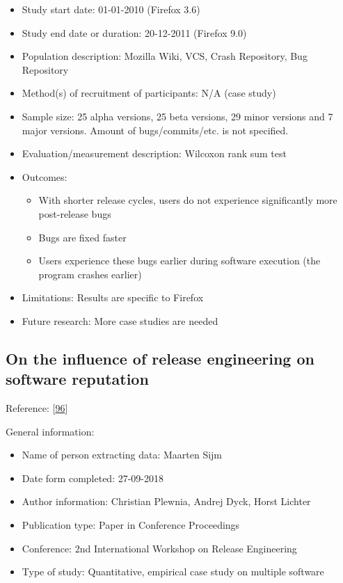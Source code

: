 \documentclass[]{book}
\providecommand{\tightlist}{%
  \setlength{\itemsep}{0pt}\setlength{\parskip}{0pt}}
\begin{document}
\begin{itemize}
\tightlist
\item
  Study start date: 01-01-2010 (Firefox 3.6)
\item
  Study end date or duration: 20-12-2011 (Firefox 9.0)
\item
  Population description: Mozilla Wiki, VCS, Crash Repository, Bug
  Repository
\item
  Method(s) of recruitment of participants: N/A (case study)
\item
  Sample size: 25 alpha versions, 25 beta versions, 29 minor versions
  and 7 major versions. Amount of bugs/commits/etc. is not specified.
\item
  Evaluation/measurement description: Wilcoxon rank sum test
\item
  Outcomes:

  \begin{itemize}
  \tightlist
  \item
    With shorter release cycles, users do not experience significantly
    more post-release bugs
  \item
    Bugs are fixed faster
  \item
    Users experience these bugs earlier during software execution (the
    program crashes earlier)
  \end{itemize}
\item
  Limitations: Results are specific to Firefox
\item
  Future research: More case studies are needed
\end{itemize}

\subsection{On the influence of release engineering on software
reputation}\label{on-the-influence-of-release-engineering-on-software-reputation}

Reference: {[}\protect\hyperlink{ref-plewnia2014a}{96}{]}

General information:

\begin{itemize}
\tightlist
\item
  Name of person extracting data: Maarten Sijm
\item
  Date form completed: 27-09-2018
\item
  Author information: Christian Plewnia, Andrej Dyck, Horst Lichter
\item
  Publication type: Paper in Conference Proceedings
\item
  Conference: 2nd International Workshop on Release Engineering
\item
  Type of study: Quantitative, empirical case study on multiple software
\end{itemize}
\end{document}
